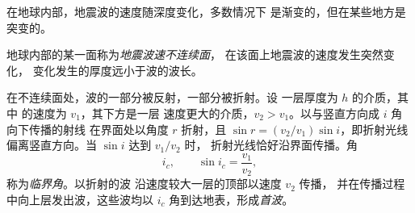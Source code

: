 在地球内部，地震波的速度随深度变化，多数情况下
是渐变的，但在某些地方是突变的。

\begin{definition}[地震波速不连续面]\label{def:g11:seismic-structure:discontinuity}
地球内部的某一面称为\emph{地震波速不连续面}，
在该面上地震波的速度发生突然变化，
变化发生的厚度远小于波的波长。
\end{definition}

在不连续面处，波的一部分被反射，一部分被折射。设
一层厚度为 $h$ 的介质，其中 的速度为 $v_1$，其下方是一层
速度更大的介质，$v_2 > v_1$。以与竖直方向成 $i$ 角向下传播的射线
在界面处以角度 $r$ 折射，且 $\sin r = (v_2/v_1)\sin
i$，即折射光线偏离竖直方向。当 $\sin i$ 达到 $v_1/v_2$ 时，
折射光线恰好沿界面传播。角
\[
  i_c, \qquad \sin i_c = \frac{v_1}{v_2},
\]
称为\emph{临界角}。以折射的波
沿速度较大一层的顶部以速度 $v_2$ 传播，
并在传播过程中向上层发出波，这些波均以
$i_c$ 角到达地表，形成\emph{首波}。

